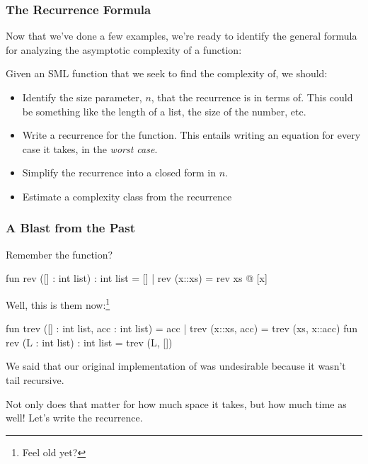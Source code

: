 \documentclass[aspectratio=169]{beamer}
\begin{document}
\begin{frame}[fragile]
  \frametitle{The Recurrence Formula}

  Now that we've done a few examples, we're ready to identify the general formula for
  analyzing the asymptotic complexity of a function:

  \pause
  \vspace{\fill}

  Given an SML function  that we seek to find the complexity of, we should:

  \pause
  \begin{itemize}
    \item Identify the size parameter, $n$, that the recurrence is in terms of. This could be something like
    the length of a list, the size of the number, etc. \pause
    \item Write a recurrence for the function. This entails writing an equation for every case it takes, in the
    \textit{worst case}. \pause
    \item Simplify the recurrence into a closed form in $n$. \pause
    \item Estimate a complexity class from the recurrence
  \end{itemize}
\end{frame}

\begin{frame}[fragile]
  \frametitle{A Blast from the Past}

  Remember the  function?

  \vspace{\fill}

  \begin{codeblock}
    fun rev ([] : int list) : int list = []
      | rev (x::xs) = rev xs @ [x]
  \end{codeblock}

  \pause
  Well, this is them now:\footnote{Feel old yet?}

  \pause
  \begin{codeblock}
    fun trev ([] : int list, acc : int list) = acc
      | trev (x::xs, acc) = trev (xs, x::acc)
    fun rev (L : int list) : int list = trev (L, [])
  \end{codeblock}

  \pause
  We said that our original implementation of  was undesirable because it wasn't tail recursive.

  \pause
  \vspace{\fill}

  Not only does that matter for how much space it takes, but how much time as well! Let's write the recurrence.

\end{frame}
\end{document}

